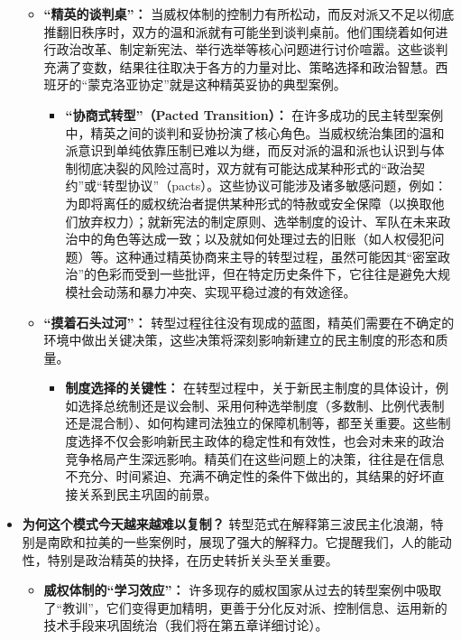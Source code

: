\documentclass[UTF8, 10pt]{ctexbook}
\begin{document}
\begin{itemize}
\begin{itemize}
\begin{itemize}
        \end{itemize}
        \item \textbf{“精英的谈判桌”：} 当威权体制的控制力有所松动，而反对派又不足以彻底推翻旧秩序时，双方的温和派就有可能坐到谈判桌前。他们围绕着如何进行政治改革、制定新宪法、举行选举等核心问题进行讨价喧嚣。这些谈判充满了变数，结果往往取决于各方的力量对比、策略选择和政治智慧。西班牙的“蒙克洛亚协定”就是这种精英妥协的典型案例。
        \begin{itemize}
            \item \textbf{“协商式转型”（Pacted Transition）：} 在许多成功的民主转型案例中，精英之间的谈判和妥协扮演了核心角色。当威权统治集团的温和派意识到单纯依靠压制已难以为继，而反对派的温和派也认识到与体制彻底决裂的风险过高时，双方就有可能达成某种形式的“政治契约”或“转型协议”（pacts）。这些协议可能涉及诸多敏感问题，例如：为即将离任的威权统治者提供某种形式的特赦或安全保障（以换取他们放弃权力）；就新宪法的制定原则、选举制度的设计、军队在未来政治中的角色等达成一致；以及就如何处理过去的旧账（如人权侵犯问题）等。这种通过精英协商来主导的转型过程，虽然可能因其“密室政治”的色彩而受到一些批评，但在特定历史条件下，它往往是避免大规模社会动荡和暴力冲突、实现平稳过渡的有效途径。
        \end{itemize}
        \item \textbf{“摸着石头过河”：} 转型过程往往没有现成的蓝图，精英们需要在不确定的环境中做出关键决策，这些决策将深刻影响新建立的民主制度的形态和质量。
        \begin{itemize}
            \item \textbf{制度选择的关键性：} 在转型过程中，关于新民主制度的具体设计，例如选择总统制还是议会制、采用何种选举制度（多数制、比例代表制还是混合制）、如何构建司法独立的保障机制等，都至关重要。这些制度选择不仅会影响新民主政体的稳定性和有效性，也会对未来的政治竞争格局产生深远影响。精英们在这些问题上的决策，往往是在信息不充分、时间紧迫、充满不确定性的条件下做出的，其结果的好坏直接关系到民主巩固的前景。
        \end{itemize}
    \end{itemize}
    \item \textbf{为何这个模式今天越来越难以复制？} 转型范式在解释第三波民主化浪潮，特别是南欧和拉美的一些案例时，展现了强大的解释力。它提醒我们，人的能动性，特别是政治精英的抉择，在历史转折关头至关重要。
    \begin{itemize}
        \item \textbf{威权体制的“学习效应”：} 许多现存的威权国家从过去的转型案例中吸取了“教训”，它们变得更加精明，更善于分化反对派、控制信息、运用新的技术手段来巩固统治（我们将在第五章详细讨论）。

\end{itemize}
\end{itemize}
\end{document}
